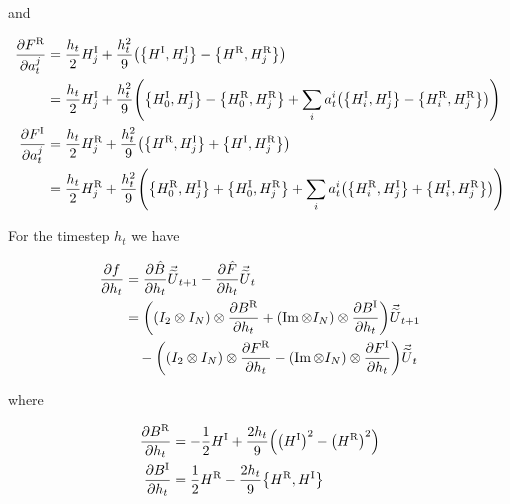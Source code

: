 \documentclass{article}
\newcommand{\isoU}{\widetilde{U}}
\newcommand{\isovecU}{\vec{\widetilde{U}}}
\newcommand{\isovec}{\text{isovec}}
\newcommand{\HI}{H^{\text{I}}}
\newcommand{\HR}{H^{\text{R}}}
\newcommand{\BR}{B^{\text{R}}}
\newcommand{\BI}{B^{\text{I}}}
\newcommand{\FR}{F^{\text{R}}}
\newcommand{\FI}{F^{\text{I}}}
\newcommand{\UR}{U^{\text{R}}}
\newcommand{\UI}{U^{\text{I}}}
\begin{document}
and 

\begin{align*}
  \pdv{\FR}{a^j_t} &= \frac{h_t}{2} \HI_j + \frac{h_t^2}{9} \qty(\qty{\HI,\HI_j} - \qty{\HR, \HR_j}) \\
  &= \frac{h_t}{2} \HI_j + \frac{h_t^2}{9} \qty(\qty{\HI_0, \HI_j} - \qty{\HR_0, \HR_j} + \sum_i a^i_t \qty(\qty{\HI_i, \HI_j} - \qty{\HR_i, \HR_j})) \\
  \pdv{\FI}{a^j_t} &= \frac{h_t}{2} \HR_j + \frac{h_t^2}{9} \qty(\qty{\HR,\HI_j} + \qty{\HI,\HR_j})\\
  &= \frac{h_t}{2} \HR_j + \frac{h_t^2}{9} \qty(\qty{\HR_0,\HI_j} + \qty{\HI_0,\HR_j} + \sum_i a^i_t \qty(\qty{\HR_i,\HI_j} + \qty{\HI_i,\HR_j})) \\
\end{align*}

For the timestep $h_t$ we have

\begin{align*}
  \pdv{f}{h_t} %
  &= \pdv{\hat B}{h_t} \isovecU_{t+1} - \pdv{\hat F}{h_t} \isovecU_{t} \\
  &= \qty((I_2 \otimes I_N) \otimes \pdv{\BR}{h_t} + (\Im \otimes I_N) \otimes \pdv{\BI}{h_t}) \isovecU_{t+1} \\
  & \quad - \qty((I_2 \otimes I_N) \otimes \pdv{\FR}{h_t} - (\Im \otimes I_N) \otimes \pdv{\FI}{h_t}) \isovecU_{t}
\end{align*}

where 

\begin{align*} 
  \pdv{\BR}{h_t} &= -\frac{1}{2} \HI + \frac{2h_t}{9} \qty(\qty(\HI)^2 - \qty(\HR)^2) \\
  \pdv{\BI}{h_t} &= \frac{1}{2} \HR - \frac{2h_t}{9} \qty{\HR,\HI}
\end{align*}
\end{document}
